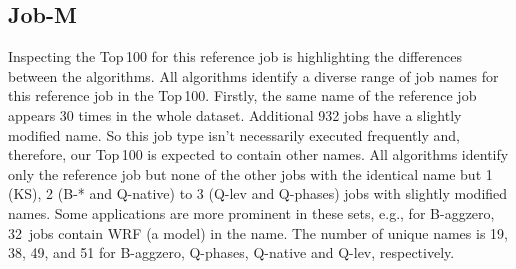 \documentclass{jhps}
\begin{document}
%


\subsection{Job-M}

Inspecting the Top\,100 for this reference job is highlighting the differences between the algorithms.
All algorithms identify a diverse range of job names for this reference job in the Top\,100.
Firstly, the same name of the reference job appears 30 times in the whole dataset. 
Additional 932 jobs have a slightly modified name.
So this job type isn't necessarily executed frequently and, therefore, our Top\,100 is expected to contain other names.
All algorithms identify only the reference job but none of the other jobs with the identical name but 1 (KS), 2 (B-* and Q-native) to 3 (Q-lev and Q-phases) jobs with slightly modified names.
Some applications are more prominent in these sets, e.g., for B-aggzero, 32~jobs contain WRF (a model) in the name.
The number of unique names is 19, 38, 49, and 51 for B-aggzero, Q-phases, Q-native and Q-lev, respectively.
\end{document}
